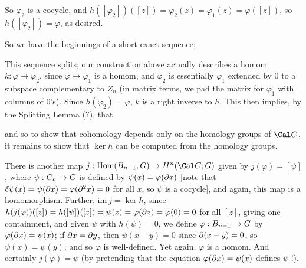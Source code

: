 So $\varphi_2$ is a cocycle, and $h([\varphi_2])([z]) = \varphi_2(z) = \varphi_1(z)
=\varphi([z])$, so $h([\varphi_2]) = \varphi$, as desired.

So we have the beginnings of a short exact sequence; 

\ssk


\ssk

This sequence splits; our construction above actually describes a homom
$k:\varphi\mapsto \varphi_2$, since $\varphi\mapsto \varphi_1$ is a homom,
and $\varphi_2$ is essentially $\varphi_1$ extended by $0$ to a subspace
complementary to $Z_n$ (in matrix terms, we pad the matrix for $\varphi_1$
with columns of $0$'s). Since $h(\varphi_2) = \varphi$, $k$ is a right
inverse to $h$. This then implies, by the Splitting Lemma (?), that

\ssk


\ssk

and so to show that cohomology depends only on the homology groups of ${\Cal C}$,
it remains to show that $\ker h$ can be computed from the homology groups.

\ssk



\msk

There is another map $j:\Hom(B_{n-1},G)\ra H^n({\Cal C};G)$ given by
$j(\varphi) = [\psi]$, where $\psi:C_n\rightarrow G$ is defined by $\psi(x)=\varphi(\partial x)$
[note that $\delta\psi(x) = \psi(\partial x) = \varphi(\partial^2 x) = 0$ for all $x$, so 
$\psi$ is a cocycle],
and again, this map is a homomorphism. Further, $\text{im}\ j = \ker h$, since
$h(j(\varphi))([z]) = h([\psi])([z]) = \psi(z) = \varphi(\partial z) = \varphi(0)=0$ for all $[z]$, giving one 
containment, and given $\psi$ with $h(\psi)=0$, we \u{define} $\varphi: B_{n-1}\rightarrow G$
by $\varphi(\partial x) = \psi(x)$; if $\partial x = \partial y$, then $\psi(x-y)=0$ since
$\partial(x-y)=0$, so $\psi(x)=\psi(y)$, and so $\varphi$ is well-defined. 
Yet again, $\varphi$ is a homom.
And certainly $j(\varphi) = \psi$ (by pretending that the equation
$\varphi(\partial x) = \psi(x)$ defines $\psi$ !).

